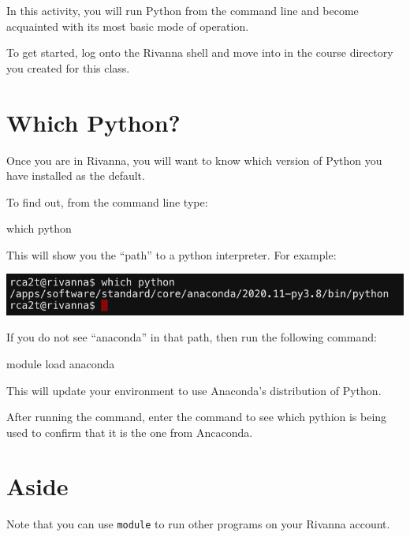 \documentclass[
  letterpaper,
  DIV=11,
  numbers=noendperiod]{scrreprt}
\newenvironment{Shaded}{\begin{snugshade}}{\end{snugshade}}
\newcommand{\ExtensionTok}[1]{\textcolor[rgb]{0.00,0.23,0.31}{#1}}
\newcommand{\FunctionTok}[1]{\textcolor[rgb]{0.28,0.35,0.67}{#1}}
\newcommand{\NormalTok}[1]{\textcolor[rgb]{0.00,0.23,0.31}{#1}}
\begin{document}
In this activity, you will run Python from the command line and become
acquainted with its most basic mode of operation.

To get started, log onto the Rivanna shell and move into in the course
directory you created for this class.

\hypertarget{which-python}{%
\section{Which Python?}\label{which-python}}

Once you are in Rivanna, you will want to know which version of Python
you have installed as the default.

To find out, from the command line type:

\begin{Shaded}
\begin{Highlighting}[]
\FunctionTok{which}\NormalTok{ python}
\end{Highlighting}
\end{Shaded}

This will show you the ``path'' to a python interpreter. For example:

\includegraphics{modules/M02_BasicPython/../../media/which-python.png}

If you do not see ``anaconda'' in that path, then run the following
command:

\begin{Shaded}
\begin{Highlighting}[]
\ExtensionTok{module}\NormalTok{ load anaconda}
\end{Highlighting}
\end{Shaded}

This will update your environment to use Anaconda's distribution of
Python.

After running the command, enter the command to see which pythion is
being used to confirm that it is the one from Ancaconda.

\hypertarget{aside}{%
\section{Aside}\label{aside}}

Note that you can use \texttt{module} to run other programs on your
Rivanna account.
\end{document}
